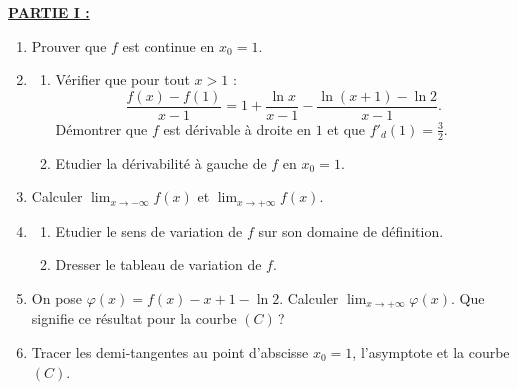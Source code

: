       \noindent \underline{\textbf{PARTIE I :}}
            \begin{enumerate}
                  \item Prouver que $f$ est continue en $x_0 = 1$.
                  \item \begin{enumerate}
                              \item V\'erifier que pour tout $x > 1$ :
                                    $$
                                    \frac{f(x)-f(1)}{x-1} = 1 + \frac{\ln x}{x-1} - \frac{\ln (x+1) - \ln 2}{x-1}
                                    .$$
                                    D\'emontrer que $f$ est d\'erivable \`a droite en $1$ et que $f'_d (1) = \frac{3}{2}$.
                              \item Etudier la d\'erivabilit\'e \`a gauche de $f$ en $x_0 = 1$.
                        \end{enumerate}
                  \item Calculer $\displaystyle{\lim_{x\rightarrow-\infty} f(x)}$ et $\displaystyle{\lim_{x\rightarrow+\infty} f(x)}$.
                  \item \begin{enumerate}
                              \item Etudier le sens de variation de $f$ sur son domaine de d\'efinition.
                              \item Dresser le tableau de variation de $f$.
                        \end{enumerate}
                  \item On pose $\varphi(x) = f(x)-x+1-\ln 2$.
                        Calculer $\displaystyle{\lim_{x\rightarrow+\infty}\varphi(x)}$.
                        Que signifie ce r\'esultat pour la courbe $(C)$\,?
                  \item Tracer les demi-tangentes au point d'abscisse $x_0 = 1$, l'asymptote et la courbe $(C)$.
            \end{enumerate}
     
